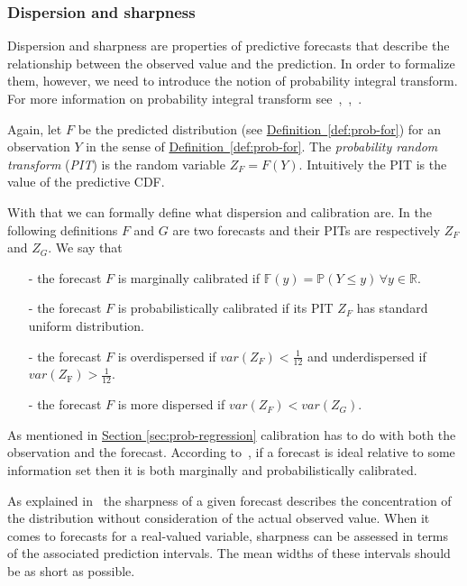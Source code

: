 \documentclass[12pt,a4paper,twoside]{scrartcl}
\numberwithin{equation}{section}
\newcommand{\refdef}[1]{\hyperref[#1]{Definition~\ref*{#1}}}
\newcommand{\refsec}[1]{\hyperref[#1]{Section \ref*{#1}}}
\begin{document}
\subsubsection{Dispersion and sharpness}\label{sec:disp-sharp}
Dispersion and sharpness are properties of predictive forecasts that describe the relationship between the observed value and the prediction. In order to formalize them, however, we need to introduce the notion of probability integral transform. For more information on probability integral transform see~\cite{diebold1998},~\cite{gneiting2007},~\cite{dawid84}.

Again, let \(F\) be the predicted distribution (see \refdef{def:prob-for}) for an observation \(Y\) in the sense of \refdef{def:prob-for}. The \emph{probability random transform} (\emph{PIT}) is the random variable \(Z_F=F(Y)\). Intuitively the PIT is the value of the predictive CDF.\@

With that we can formally define what dispersion and calibration are. In the following definitions \(F\) and \(G\) are two forecasts and their PITs are respectively \(Z_F\) and \(Z_G\). We say that
\begin{itemize}
\item[-] the forecast \(F\) is marginally calibrated if \(\mathbb{F}(y) = \mathbb{P}(Y \leq y)\, \forall y\in\mathbb{R}\).
\item[-] the forecast \(F\) is probabilistically calibrated if its PIT \(Z_F\) has standard uniform distribution.
\item[-] the forecast \(F\) is overdispersed if \(var(Z_F) < \frac{1}{12}\) and underdispersed if \(var(Z_{\text{F}}) > \frac{1}{12} \).
\item[-] the forecast \(F\) is more dispersed if \(var(Z_F) < var(Z_G)\).
\end{itemize}

As mentioned in \refsec{sec:prob-regression} calibration has to do with both the observation and the forecast. According to~\cite{gneiting2014}, if a forecast is ideal relative to some information set then it is both marginally and probabilistically calibrated.

As explained in~\cite{gneiting2014} the sharpness of a given forecast describes the concentration of the distribution without consideration of the actual observed value. When it comes to forecasts for a real-valued variable, sharpness can be assessed in terms of the associated prediction intervals. The mean widths of these intervals should be as short as possible. 
\end{document}
